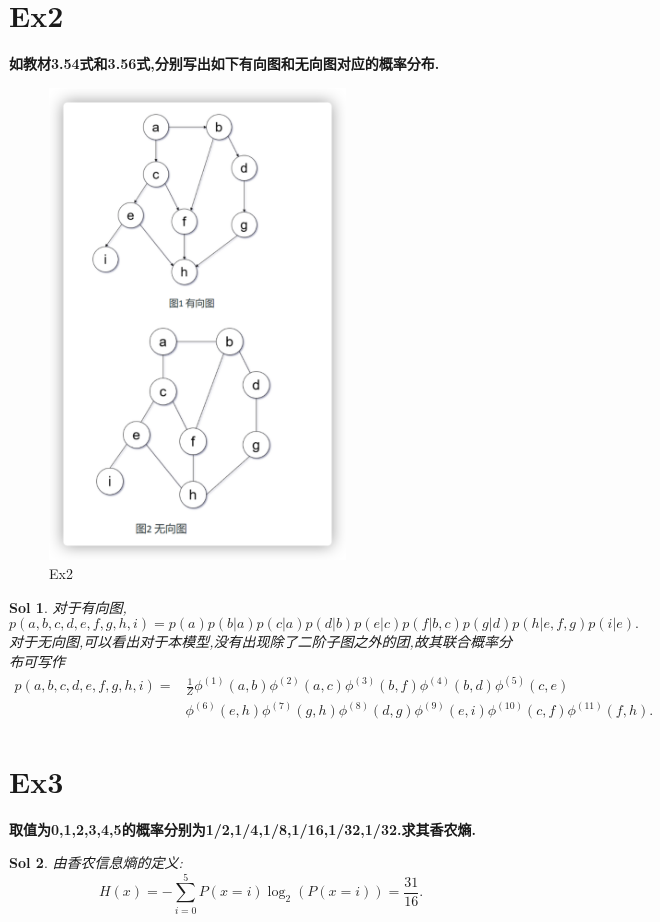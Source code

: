 \documentclass[UTF8,a4paper,11pt]{ctexart}
\newtheorem{sol}{Sol}[section]
\begin{document}
\section{Ex2}
\textbf{如教材3.54式和3.56式,分别写出如下有向图和无向图对应的概率分布.}
\begin{figure}[H]
	\centering
	\includegraphics[width=0.7\textwidth,height=0.9\textwidth]{Ex2.png}
	\caption{Ex2}
\end{figure}
\begin{sol}
	对于有向图,$$p(a,b,c,d,e,f,g,h,i)=p(a)p(b|a)p(c|a)p(d|b)p(e|c)p(f|b,c)p(g|d)p(h|e,f,g)p(i|e).$$
	对于无向图,可以看出对于本模型,没有出现除了二阶子图之外的团,故其联合概率分布可写作\begin{equation*}
		\begin{split}
p(a,b,c,d,e,f,g,h,i)=&\frac{1}{Z}\phi^{(1)}(a,b)\phi^{(2)}(a,c)\phi^{(3)}(b,f)\phi^{(4)}(b,d)\phi^{(5)}(c,e)\\
	&\phi^{(6)}(e,h)\phi^{(7)}(g,h)\phi^{(8)}(d,g)
	\phi^{(9)}(e,i)\phi^{(10)}(c,f)\phi^{(11)}(f,h).
	\end{split}
	\end{equation*}
\end{sol}
\section{Ex3}
\textbf{取值为0,1,2,3,4,5的概率分别为1/2,1/4,1/8,1/16,1/32,1/32.求其香农熵.}
\begin{sol}
	由香农信息熵的定义:
	$$
	H(x)=-\sum_{i=0}^{5}P(x=i)\log_{2}(P(x=i))=\frac{31}{16}.
	$$
\end{sol}
\end{document}
